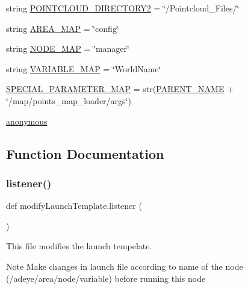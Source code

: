 \begin{DoxyCompactItemize}
\item 
string \hyperlink{namespacemodifyLaunchTemplate_a64083dad845de1c4d2c64a3a1d4565a3}{P\+O\+I\+N\+T\+C\+L\+O\+U\+D\+\_\+\+D\+I\+R\+E\+C\+T\+O\+R\+Y2} = \char`\"{}/Pointcloud\+\_\+\+Files/\char`\"{}
\item 
string \hyperlink{namespacemodifyLaunchTemplate_add8e1696afdfabd798d3f62fc0108b4c}{A\+R\+E\+A\+\_\+\+M\+AP} = \char`\"{}config\char`\"{}
\item 
string \hyperlink{namespacemodifyLaunchTemplate_ac6cc7644ea2bbe0490d58ef54d4b98b4}{N\+O\+D\+E\+\_\+\+M\+AP} = \char`\"{}manager\char`\"{}
\item 
string \hyperlink{namespacemodifyLaunchTemplate_abeff93e72ad7858c57e1ad4627c29dc2}{V\+A\+R\+I\+A\+B\+L\+E\+\_\+\+M\+AP} = \char`\"{}World\+Name\char`\"{}
\item 
\hyperlink{namespacemodifyLaunchTemplate_a17dc7242dba28b270449d06b6ad3756d}{S\+P\+E\+C\+I\+A\+L\+\_\+\+P\+A\+R\+A\+M\+E\+T\+E\+R\+\_\+\+M\+AP} = str(\hyperlink{namespacemodifyLaunchTemplate_abdad9725634f03bab11d245d42e6163b}{P\+A\+R\+E\+N\+T\+\_\+\+N\+A\+ME} + \char`\"{}/map/points\+\_\+map\+\_\+loader/args\char`\"{})
\item 
\hyperlink{namespacemodifyLaunchTemplate_a687e8e8f3f74c309a1ac6ed3896967d9}{anonymous}
\end{DoxyCompactItemize}


\subsection{Function Documentation}
\mbox{\label{namespacemodifyLaunchTemplate_a7e2ff27db203e88d463bc3f4544eb0d1}} 
\subsubsection{\texorpdfstring{listener()}{listener()}}
{\footnotesize\ttfamily def modify\+Launch\+Template.\+listener (\begin{DoxyParamCaption}{ }\end{DoxyParamCaption})}



This file modifies the launch tempelate. 

\begin{DoxyNote}{Note}
Make changes in launch file according to name of the node (/adeye/area/node/variable) before running this node
\end{DoxyNote}

